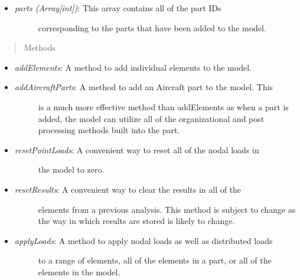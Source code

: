 \documentclass[letterpaper,10pt,english]{sphinxmanual}
\begin{document}
\begin{fulllineitems}
\begin{itemize}
\begin{description}
\end{description}

\item {} \begin{description}
\item[{\emph{parts (Array{[}int{]})}: This array contains all of the part IDs}] \leavevmode
corresponding to the parts that have been added to the model.

\end{description}

\end{itemize}
\begin{quote}\begin{description}
\item[{Methods}] \leavevmode
\end{description}\end{quote}
\begin{itemize}
\item {} 
\emph{addElements}: A method to add individual elements to the model.

\item {} \begin{description}
\item[{\emph{addAircraftParts}: A method to add an Aircraft part to the model. This}] \leavevmode
is a much more effective method than addElements as when a part is
added, the model can utilize all of the organizational and post
processing methods built into the part.

\end{description}

\item {} \begin{description}
\item[{\emph{resetPointLoads}: A convenient way to reset all of the nodal loads in}] \leavevmode
the model to zero.

\end{description}

\item {} \begin{description}
\item[{\emph{resetResults}: A convenient way to clear the results in all of the}] \leavevmode
elements from a previous analysis. This method is subject to change as
the way in which results are stored is likely to change.

\end{description}

\item {} \begin{description}
\item[{\emph{applyLoads}: A method to apply nodal loads as well as distributed loads}] \leavevmode
to a range of elements, all of the elements in a part, or all of the
elements in the model.


\end{description}
\end{itemize}
\end{fulllineitems}
\end{document}
